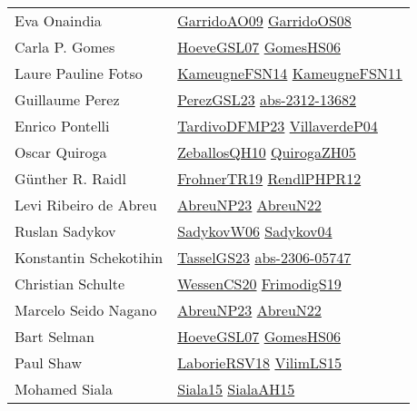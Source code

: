 {\begin{longtable}{p{4cm}p{20cm}}
Eva Onaindia & \href{articles/GarridoAO09.pdf}{GarridoAO09}\cite{GarridoAO09} \href{articles/GarridoOS08.pdf}{GarridoOS08}\cite{GarridoOS08} \\
Carla P. Gomes & \href{papers/HoeveGSL07.pdf}{HoeveGSL07}\cite{HoeveGSL07} \href{papers/GomesHS06.pdf}{GomesHS06}\cite{GomesHS06} \\
Laure Pauline Fotso & \href{articles/KameugneFSN14.pdf}{KameugneFSN14}\cite{KameugneFSN14} \href{papers/KameugneFSN11.pdf}{KameugneFSN11}\cite{KameugneFSN11} \\
Guillaume Perez & \href{papers/PerezGSL23.pdf}{PerezGSL23}\cite{PerezGSL23} \href{articles/abs-2312-13682.pdf}{abs-2312-13682}\cite{abs-2312-13682} \\
Enrico Pontelli & \href{papers/TardivoDFMP23.pdf}{TardivoDFMP23}\cite{TardivoDFMP23} \href{papers/VillaverdeP04.pdf}{VillaverdeP04}\cite{VillaverdeP04} \\
Oscar Quiroga & \href{articles/ZeballosQH10.pdf}{ZeballosQH10}\cite{ZeballosQH10} \href{papers/QuirogaZH05.pdf}{QuirogaZH05}\cite{QuirogaZH05} \\
G{\"{u}}nther R. Raidl & \href{papers/FrohnerTR19.pdf}{FrohnerTR19}\cite{FrohnerTR19} \href{papers/RendlPHPR12.pdf}{RendlPHPR12}\cite{RendlPHPR12} \\
Levi Ribeiro de Abreu & \href{articles/AbreuNP23.pdf}{AbreuNP23}\cite{AbreuNP23} \href{articles/AbreuN22.pdf}{AbreuN22}\cite{AbreuN22} \\
Ruslan Sadykov & \href{articles/SadykovW06.pdf}{SadykovW06}\cite{SadykovW06} \href{papers/Sadykov04.pdf}{Sadykov04}\cite{Sadykov04} \\
Konstantin Schekotihin & \href{papers/TasselGS23.pdf}{TasselGS23}\cite{TasselGS23} \href{articles/abs-2306-05747.pdf}{abs-2306-05747}\cite{abs-2306-05747} \\
Christian Schulte & \href{papers/WessenCS20.pdf}{WessenCS20}\cite{WessenCS20} \href{papers/FrimodigS19.pdf}{FrimodigS19}\cite{FrimodigS19} \\
Marcelo Seido Nagano & \href{articles/AbreuNP23.pdf}{AbreuNP23}\cite{AbreuNP23} \href{articles/AbreuN22.pdf}{AbreuN22}\cite{AbreuN22} \\
Bart Selman & \href{papers/HoeveGSL07.pdf}{HoeveGSL07}\cite{HoeveGSL07} \href{papers/GomesHS06.pdf}{GomesHS06}\cite{GomesHS06} \\
Paul Shaw & \href{articles/LaborieRSV18.pdf}{LaborieRSV18}\cite{LaborieRSV18} \href{papers/VilimLS15.pdf}{VilimLS15}\cite{VilimLS15} \\
Mohamed Siala & \href{articles/Siala15.pdf}{Siala15}\cite{Siala15} \href{papers/SialaAH15.pdf}{SialaAH15}\cite{SialaAH15} \\

\end{longtable}}
